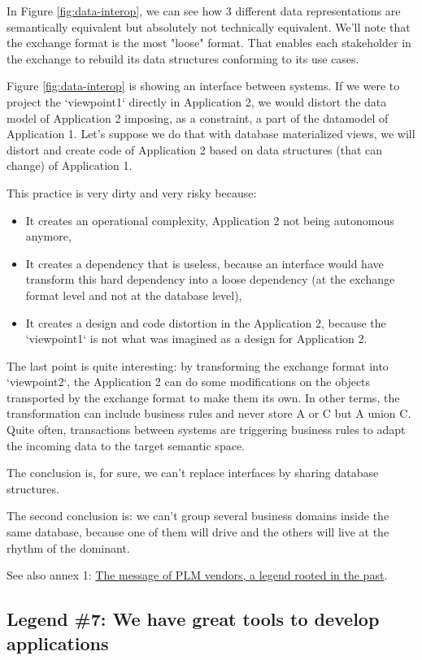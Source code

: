 \documentclass[]{article}
\begin{document}
In Figure \ref{fig:data-interop}, we can see how 3 different data representations are semantically equivalent but absolutely not technically equivalent. We'll note that the exchange format is the most "loose" format. That enables each stakeholder in the exchange to rebuild its data structures conforming to its use cases.

Figure \ref{fig:data-interop} is showing an interface between systems. If we were to project the `viewpoint1` directly in Application 2, we would distort the data model of Application 2 imposing, as a constraint, a part of the datamodel of Application 1. Let's suppose we do that with database materialized views, we will distort and create code of Application 2 based on data structures (that can change) of Application 1.

This practice is very dirty and very risky because:

\begin{itemize}
\item It creates an operational complexity, Application 2 not being autonomous anymore,
\item It creates a dependency that is useless, because an interface would have transform this hard dependency into a loose dependency (at the exchange format level and not at the database level),
\item It creates a design and code distortion in the Application 2, because the `viewpoint1` is not what was imagined as a design for Application 2.
\end{itemize}

The last point is quite interesting: by transforming the exchange format into `viewpoint2`, the Application 2 can do some modifications on the objects transported by the exchange format to make them its own. In other terms, the transformation can include business rules and never store A or C but A union C. Quite often, transactions between systems are triggering business rules to adapt the incoming data to the target semantic space.

The conclusion is, for sure, we can't replace interfaces by sharing database structures.

The second conclusion is: we can't group several business domains inside the same database, because one of them will drive and the others will live at the rhythm of the dominant.

See also annex 1: \hyperref[plm-vendors]{The message of PLM vendors, a legend rooted in the past}.

\subsection{Legend \#7: We have great tools to develop applications}
\end{document}
